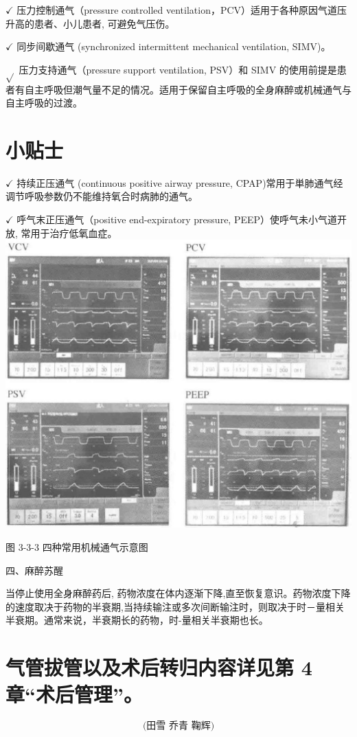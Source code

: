 \documentclass[10pt]{article}
\begin{document}
$\checkmark$ 压力控制通气（pressure controlled ventilation，PCV）适用于各种原因气道压升高的患者、小儿患者, 可避免气压伤。

$\checkmark$ 同步间歇通气 (synchronized intermittent mechanical ventilation, SIMV)。

$\sqrt{ }$ 压力支持通气（pressure support ventilation, PSV）和 SIMV 的使用前提是患者有自主呼吸但潮气量不足的情况。适用于保留自主呼吸的全身麻醉或机械通气与自主呼吸的过渡。

\section*{小贴士}
$\checkmark$ 持续正压通气 (continuous positive airway pressure, CPAP)常用于単肺通气经调节呼吸参数仍不能维持氧合时病肺的通气。

$\checkmark$ 呼气末正压通气（positive end-expiratory pressure, PEEP）使呼气未小气道开放, 常用于治疗低氧血症。\\
\includegraphics[max width=\textwidth, center]{2024_07_05_645bb794a4d4f32ee0c8g-089}

图 3-3-3 四种常用机械通气示意图

四、麻醉苏醒

当停止使用全身麻醉药后, 药物浓度在体内逐渐下降,直至恢复意识。药物浓度下降的速度取决于药物的半衰期,当持续输注或多次间断输注时，则取决于时－量相关半衰期。通常来说，半衰期长的药物，时-量相关半衰期也长。

\section*{气管拔管以及术后转归内容详见第 4 章“术后管理”。}
\[
\text { (田雪 乔青 鞠辉) }
\]
\end{document}
